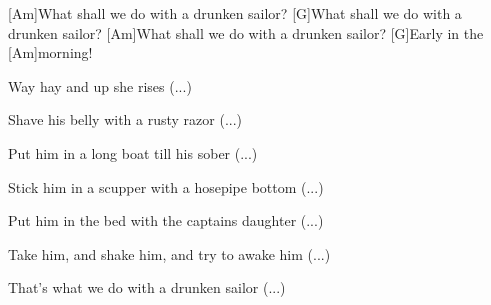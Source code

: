 



\begin{guitar}
	[Am]What shall we do with a drunken sailor?
	[G]What shall we do with a drunken sailor?
	[Am]What shall we do with a drunken sailor?
	[G]Early in the [Am]morning!
	
	\begin{highlightbar}
		Way hay and up she rises (...)
	\end{highlightbar}
		
	Shave his belly with a rusty razor (...)
	
	Put him in a long boat till his sober (...)
	
	Stick him in a scupper with a hosepipe bottom (...)
	
	Put him in the bed with the captains daughter (...)
	
	Take him, and shake him, and try to awake him (...)
	
	That's what we do with a drunken sailor (...)
\end{guitar}